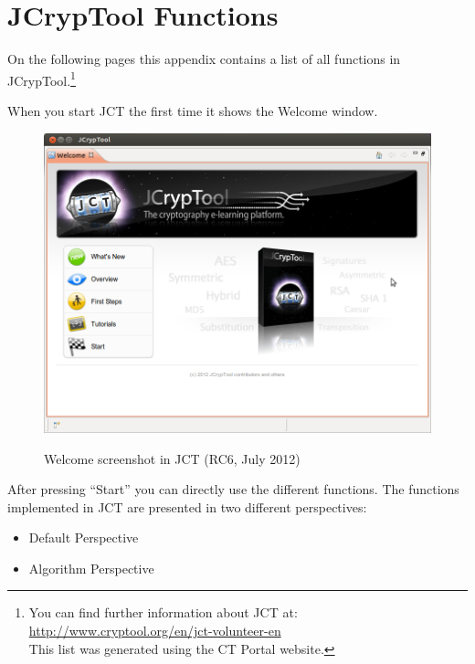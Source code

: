 \section{JCrypTool Functions}
\label{s:appendix-function-overview-JCT}

\noindent On the following pages this appendix contains a list of all
functions in JCrypTool.\footnote{%
  You can find further information about JCT at:
  \url{http://www.cryptool.org/en/jct-volunteer-en} \\
  This list was generated using the CT Portal website.}

\noindent When you start JCT the first time it shows the Welcome window.

\begin{figure}[hb]
\begin{center}
\includegraphics[scale=0.45, angle=0] {figures/JCT-Welcome-EN}
\hypertarget{Welcome-Screenshot-JCT}{}
\caption{Welcome screenshot in JCT (RC6, July 2012)} 
\label{Welcome-Screenshot-JCT}
\end{center}
\end{figure}
After pressing ``Start'' you can directly use the different functions.
The functions implemented in JCT are presented in two different perspectives:
\begin{itemize}
   \item Default Perspective
   \item Algorithm Perspective
 \end{itemize}

